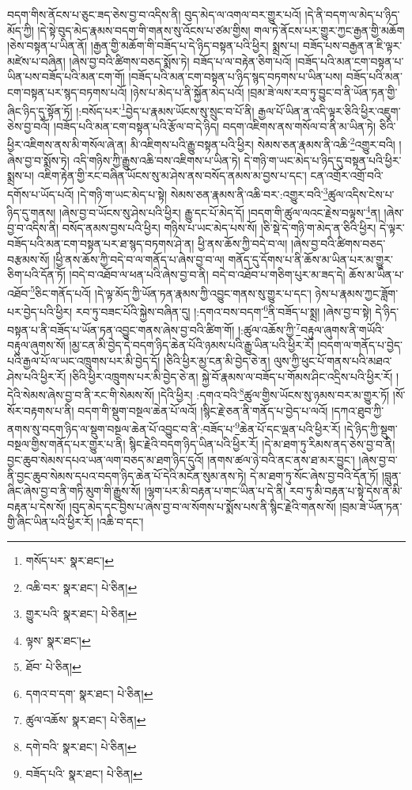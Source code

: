 བདག་གིས་ནོངས་པ་ཅུང་ཟད་ཅེས་བྱ་བ་འདིས་ནི། བུད་མེད་ལ་འགལ་བར་གྱུར་པའོ། །དེ་ནི་བདག་ལ་མེད་པ་ཉིད་མོད་ཀྱི། །དེ་སྟེ་བུད་མེད་རྣམས་བདག་གི་གནས་སུ་འོངས་པ་ཙམ་གྱིས། གལ་ཏེ་ནོངས་པར་གྱུར་ཀྱང་རྒྱན་གྱི་མཆོག །ཅེས་བསྟན་པ་ཡིན་ནོ། །རྒྱན་གྱི་མཆོག་གི་བཟོད་པ་དེ་ཉིད་བསྟན་པའི་ཕྱིར། སྨྲས་པ། བཟོད་པས་བརྒྱན་ན་ཇི་ལྟར་མཛེས་པ་བཞིན། །ཞེས་བྱ་བའི་ཚིགས་བཅད་སྨོས་ཏེ། བཟོད་པ་ལ་བརྟེན་ཅིག་པའོ། །བཟོད་པའི་མན་ངག་བསྟན་པ་ཡིན་པས་བཟོད་པའི་མན་ངག་གོ། །བཟོད་པའི་མན་ངག་བསྟན་པ་ཉིད་སྙད་བཏགས་པ་ཡིན་པས། བཟོད་པའི་མན་ངག་བསྟན་པར་སྙད་བཏགས་པའོ། །ཉེས་པ་མེད་པ་ནི་སྐྱོན་མེད་པའོ། །བྲམ་ཟེ་ལས་རབ་ཏུ་བྱུང་བ་ནི་ཡོན་ཏན་གྱི་ཞིང་ཉིད་དུ་སྟོན་ཏོ། །:བསོད་པར་\footnote{གསོད་པར་  སྣར་ཐང་། }བྱེད་པ་རྣམས་ཡོངས་སུ་སྲུང་བ་པོ་ནི། རྒྱལ་པོ་ཡིན་ན་འདི་ལྟར་ཅིའི་ཕྱིར་འཇུག་ཅེས་བྱ་བའོ། །བཟོད་པའི་མན་ངག་བསྟན་པའི་རྩོལ་བ་དེ་ཉིད། བདག་འཇིགས་ནས་གསོལ་བ་ནི་མ་ཡིན་ཏེ། ཅིའི་ཕྱིར་འཇིགས་ནས་མི་གསོལ་ཞེ་ན། མི་འཇིགས་པའི་རྒྱུ་བསྟན་པའི་ཕྱིར། སེམས་ཅན་རྣམས་ནི་འཆི་\footnote{འཆི་བར་  སྣར་ཐང་།  པེ་ཅིན། }འགྱུར་བའི། །ཞེས་བྱ་བ་སྨོས་ཏེ། འདི་གཉིས་ཀྱི་རྒྱུས་འཆི་བས་འཇིགས་པ་ཡིན་ཏེ། དེ་གཉི་ག་ཡང་མེད་པ་ཉིད་དུ་བསྟན་པའི་ཕྱིར་སྨྲས་པ། འཇིག་རྟེན་གྱི་རང་བཞིན་ཡོངས་སུ་མ་ཤེས་ནས་བསོད་ནམས་མ་བྱས་པ་དང་། ངན་འགྲོར་འགྲོ་བའི་དགོས་པ་ཡོད་པའོ། །དེ་གཉི་ག་ཡང་མེད་པ་སྟེ། སེམས་ཅན་རྣམས་ནི་འཆི་བར་:འགྱུར་བའི་\footnote{གྱུར་པའི་  སྣར་ཐང་།  པེ་ཅིན། }ཚུལ་འདིས་ངེས་པ་ཉིད་དུ་གནས། །ཞེས་བྱ་བ་ཡོངས་སུ་ཤེས་པའི་ཕྱིར། རྒྱུ་དང་པོ་མེད་དོ། །བདག་གི་ཚུལ་ལའང་རྗེས་བལྟས་\footnote{ལྟས་  སྣར་ཐང་། }ན། །ཞེས་བྱ་བ་འདིས་ནི། བསོད་ནམས་བྱས་པའི་ཕྱིར། གཉིས་པ་ཡང་མེད་པས་སོ། །ཅི་སྡེ་དེ་གཉི་ག་མེད་ན་ཅིའི་ཕྱིར། དེ་ལྟར་བཟོད་པའི་མན་ངག་བསྟན་པར་ཐ་སྙད་བཏགས་ཤེ་ན། ཕྱི་ནས་ཆོས་ཀྱི་བདེ་བ་ལ། །ཞེས་བྱ་བའི་ཚིགས་བཅད་བརྩམས་སོ། །ཕྱི་ནས་ཆོས་ཀྱི་བདེ་བ་ལ་གནོད་པ་ཞེས་བྱ་བ་ལ། གནོད་དུ་དོགས་པ་ནི་ཆོས་མ་ཡིན་པར་མ་གྱུར་ཅིག་པའི་དོན་ཏོ། །བདེ་བ་འཐོབ་ལ་ཕན་པའི་ཞེས་བྱ་བ་ནི། བདེ་བ་འཐོབ་པ་གཅིག་པུར་མ་ཟད་དེ། ཆོས་མ་ཡིན་པ་འཐོབ་\footnote{ཐོབ་  པེ་ཅིན། }ཅིང་གནོད་པའོ། །དེ་ལྟ་མོད་ཀྱི་ཡོན་ཏན་རྣམས་ཀྱི་འབྱུང་གནས་སུ་གྱུར་པ་དང་། ཉེས་པ་རྣམས་ཀྱང་ཟློག་པར་བྱེད་པའི་ཕྱིར། རབ་ཏུ་བཟང་པོའི་སྐྱེས་བཞིན་དུ། །:དགའ་བས་བདག་\footnote{དགའ་བ་དག་  སྣར་ཐང་།  པེ་ཅིན། }ནི་བཟོད་པ་སྨྲ། །ཞེས་བྱ་བ་སྟེ། དེ་ཉིད་བསྟན་པ་ནི་བཟོད་པ་ཡོན་ཏན་འབྱུང་གནས་ཞེས་བྱ་བའི་ཚིག་གོ། །:ཚུལ་འཆོས་ཀྱི་\footnote{ཚུལ་འཆོས་  སྣར་ཐང་།  པེ་ཅིན། }བརྟུལ་ཞུགས་ནི་གཡོའི་བརྟུལ་ཞུགས་སོ། །མྱ་ངན་མི་བྱེད་དེ་བདག་ཉིད་ཆེན་པོའི་ཉམས་པའི་རྒྱུ་ཡིན་པའི་ཕྱིར་རོ། །བདག་ལ་གནོད་པ་བྱེད་པའི་རྒྱལ་པོ་ལ་ཡང་འཁྲུགས་པར་མི་བྱེད་དོ། །ཅིའི་ཕྱིར་མྱ་ངན་མི་བྱེད་ཅེ་ན། ལུས་ཀྱི་ཕུང་པོ་གནས་པའི་མཐའ་ཤེས་པའི་ཕྱིར་རོ། །ཅིའི་ཕྱིར་འཁྲུགས་པར་མི་བྱེད་ཅེ་ན། སྐྱེ་བོ་རྣམས་ལ་བཟོད་པ་གོམས་ཤིང་འདྲིས་པའི་ཕྱིར་རོ། །དེའི་སེམས་ཞེས་བྱ་བ་ནི་རང་གི་སེམས་སོ། །དེའི་ཕྱིར། :དགའ་བའི་\footnote{དགེ་བའི་  སྣར་ཐང་།  པེ་ཅིན། }ཚུལ་གྱིས་ཡོངས་སུ་ཉམས་བར་མ་གྱུར་ཏོ། །སོ་སོར་བརྟགས་པ་ནི། བདག་གི་སྡུག་བསྔལ་ཆེན་པོ་ལའོ། །སྙིང་རྗེ་ཅན་ནི་གནོད་པ་བྱེད་པ་ལའོ། །དཀའ་ཐུབ་ཀྱི་ནགས་སུ་བདག་ཉིད་ལ་སྡུག་བསྔལ་ཆེན་པོ་འབྱུང་བ་ནི་:བཟོད་པ་\footnote{བཟོད་པའི་  སྣར་ཐང་།  པེ་ཅིན། }ཆེན་པོ་དང་ལྡན་པའི་ཕྱིར་རོ། །དེ་ཉིད་ཀྱི་སྡུག་བསྔལ་གྱིས་གནོད་པར་གྱུར་པ་ནི། སྙིང་རྗེའི་བདག་ཉིད་ཡིན་པའི་ཕྱིར་རོ། །དེ་མ་ཐག་ཏུ་རིམས་ནད་ཅེས་བྱ་བ་ནི། བྱང་ཆུབ་སེམས་དཔའ་ཡན་ལག་བཅད་མ་ཐག་ཉིད་དུའོ། །ནགས་ཚལ་ཉེ་བའི་ནང་ནས་ཐ་མར་བྱུང་། །ཞེས་བྱ་བ་ནི་བྱང་ཆུབ་སེམས་དཔའ་བདག་ཉིད་ཆེན་པོ་དེའི་མངོན་སུམ་ནས་ཏེ། དེ་མ་ཐག་ཏུ་སོང་ཞེས་བྱ་བའི་དོན་ཏོ། །བླུན་ཞིང་ཞེས་བྱ་བ་ནི་གཏི་མུག་གི་རྒྱུས་སོ། །ལྷག་པར་མི་བརྟན་པ་གང་ཡིན་པ་དེ་ནི། རབ་ཏུ་མི་བརྟན་པ་སྟེ་དེས་ན་མི་བརྟན་པ་དེས་སོ། །བུད་མེད་དང་བྱིས་པ་ཞེས་བྱ་བ་ལ་སོགས་པ་སྨོས་པས་ནི་སྙིང་རྗེའི་གནས་སོ། །བྲམ་ཟེ་ཡོན་ཏན་གྱི་ཞིང་ཡིན་པའི་ཕྱིར་རོ། །འཆི་བ་དང་། 